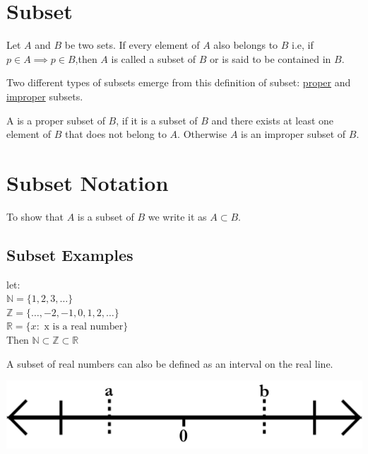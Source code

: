 \section{Subset}

\begin{definition}
    Let $A$ and $B$ be two sets. If every element of $A$ also belongs to $B$ i.e, if $p \in A \implies p \in B$,then $A$ is called a subset of $B$ or is said to be contained in $B$.
\end{definition}

\begin{para}
    Two different types of subsets emerge from this definition of subset: \underline{proper} and \underline{improper} subsets.
\end{para}

\begin{definition}
    A is a proper subset of $B$, if it is a subset of $B$ and there exists at least one element of $B$ that does not belong to $A$. Otherwise $A$ is an improper subset of $B$.
\end{definition}

\section{Subset Notation}

\begin{para}
    To show that $A$ is a subset of $B$ we write it as $A \subset B$.
\end{para}

\subsection{Subset Examples}

let:\\
$\mathbb{N} = \{1, 2, 3, \ldots\}$\\
$\mathbb{Z} = \{\ldots, -2, -1, 0, 1, 2, \ldots\}$\\
$\mathbb{R} = \{x: \text{ x is a real number}\}$\\

Then $\mathbb{N} \subset \mathbb{Z} \subset \mathbb{R}$

\begin{para}
    A subset of real numbers can also be defined as an interval on the real line.

    \begin{center}
        \includegraphics[width=0.3\linewidth]{chapter/sets and elements/numberLine.png}
    \end{center}

\end{para}



